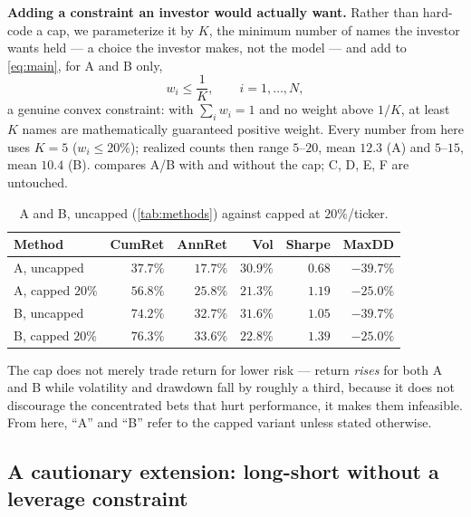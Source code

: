 \textbf{Adding a constraint an investor would actually want.} Rather than hard-code a cap, we
parameterize it by $K$, the minimum number of names the investor wants held --- a choice the
investor makes, not the model --- and add to \cref{eq:main}, for A and B only,
\begin{equation}\label{eq:capk}
w_i \le \frac{1}{K}, \qquad i = 1,\dots,N,
\end{equation}
a genuine convex constraint: with $\sum_i w_i=1$ and no weight above $1/K$, at least $K$ names are
mathematically guaranteed positive weight. Every number from here uses $K=5$ ($w_i\le20\%$);
realized counts then range $5$--$20$, mean $12.3$ (A) and $5$--$15$, mean $10.4$ (B).
 compares A/B with and without the cap; C, D, E, F are untouched.

\begin{table}[htbp]
\centering
\caption{A and B, uncapped (\cref{tab:methods}) against capped at $20\%$/ticker.}
\label{tab:beforeafter}
\small
\begin{tabular}{@{}lrrrrr@{}}
\toprule
\textbf{Method} & \textbf{CumRet} & \textbf{AnnRet} & \textbf{Vol} & \textbf{Sharpe} & \textbf{MaxDD} \\
\midrule
A, uncapped         & $37.7\%$ & $17.7\%$ & $30.9\%$ & $0.68$ & $-39.7\%$ \\
A, capped $20\%$    & $56.8\%$ & $25.8\%$ & $21.3\%$ & $1.19$ & $-25.0\%$ \\
B, uncapped         & $74.2\%$ & $32.7\%$ & $31.6\%$ & $1.05$ & $-39.7\%$ \\
B, capped $20\%$    & $\mathbf{76.3\%}$ & $\mathbf{33.6\%}$ & $22.8\%$ & $\mathbf{1.39}$ & $-25.0\%$ \\
\bottomrule
\end{tabular}
\end{table}

The cap does not merely trade return for lower risk --- return \emph{rises} for both A and B while
volatility and drawdown fall by roughly a third, because it does not discourage the concentrated
bets that hurt performance, it makes them infeasible. From here, ``A'' and ``B'' refer to the
capped variant unless stated otherwise.

\subsection{A cautionary extension: long-short without a leverage constraint}\label{sec:ef}


